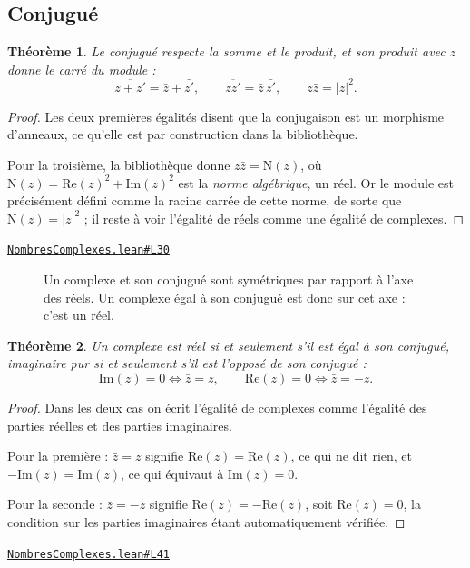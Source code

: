 \documentclass[11pt,a4paper]{article}
\theoremstyle{definition}
\theoremstyle{plain}
\newtheorem{theoreme}{Théorème}
\newcommand{\source}[2]{\par\smallskip\noindent\hfill{\footnotesize\href{#1}{\texttt{#2}}}\par\smallskip}
\begin{document}
\subsection{Conjugué}

\begin{theoreme}
Le conjugué respecte la somme et le produit, et son produit avec $z$ donne le carré du
module :
\[ \overline{z + z'} = \bar z + \bar{z'}, \qquad
   \overline{zz'} = \bar z \,\bar{z'}, \qquad
   z \bar z = |z|^{2} . \]
\end{theoreme}

\begin{proof}
Les deux premières égalités disent que la conjugaison est un morphisme d'anneaux, ce
qu'elle est par construction dans la bibliothèque.

Pour la troisième, la bibliothèque donne $z \bar z = \mathrm{N}(z)$, où
$\mathrm{N}(z) = \mathrm{Re}(z)^{2} + \mathrm{Im}(z)^{2}$ est la \emph{norme
algébrique}, un réel. Or le module est précisément défini comme la racine
carrée de cette norme, de sorte que $\mathrm{N}(z) = |z|^{2}$ ; il reste à voir l'égalité de
réels comme une égalité de complexes.
\end{proof}
\source{https://github.com/Commutator-IO/learn-lean/blob/main/courses/02-lycee/07-nombres-complexes/NombresComplexes.lean\#L30}{NombresComplexes.lean\#L30}

\begin{figure}[h]
\centering

\caption{Un complexe et son conjugué sont symétriques par rapport à l'axe des réels. Un complexe égal à son conjugué est donc sur cet axe : c'est un réel.}
\end{figure}

\begin{theoreme}
Un complexe est réel si et seulement s'il est égal à son conjugué, imaginaire pur si et
seulement s'il est l'opposé de son conjugué :
\[ \mathrm{Im}(z) = 0 \iff \bar z = z , \qquad
   \mathrm{Re}(z) = 0 \iff \bar z = -z . \]
\end{theoreme}

\begin{proof}
Dans les deux cas on écrit l'égalité de complexes comme l'égalité des parties réelles et
des parties imaginaires.

Pour la première : $\bar z = z$ signifie $\mathrm{Re}(z) = \mathrm{Re}(z)$, ce qui ne dit
rien, et $-\mathrm{Im}(z) = \mathrm{Im}(z)$, ce qui équivaut à $\mathrm{Im}(z) = 0$.

Pour la seconde : $\bar z = -z$ signifie $\mathrm{Re}(z) = -\mathrm{Re}(z)$, soit
$\mathrm{Re}(z) = 0$, la condition sur les parties imaginaires étant automatiquement
vérifiée.
\end{proof}
\source{https://github.com/Commutator-IO/learn-lean/blob/main/courses/02-lycee/07-nombres-complexes/NombresComplexes.lean\#L41}{NombresComplexes.lean\#L41}
\end{document}
